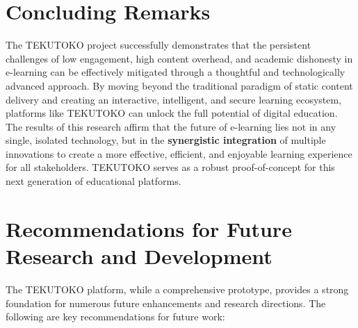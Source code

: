 \section{Concluding Remarks}
\label{sec:conclusion-remarks}
The TEKUTOKO project successfully demonstrates that the persistent challenges of low engagement, high content overhead, and academic dishonesty in e-learning can be effectively mitigated through a thoughtful and technologically advanced approach. By moving beyond the traditional paradigm of static content delivery and creating an interactive, intelligent, and secure learning ecosystem, platforms like TEKUTOKO can unlock the full potential of digital education. The results of this research affirm that the future of e-learning lies not in any single, isolated technology, but in the \textbf{synergistic integration} of multiple innovations to create a more effective, efficient, and enjoyable learning experience for all stakeholders. TEKUTOKO serves as a robust proof-of-concept for this next generation of educational platforms.

\section{Recommendations for Future Research and Development}
\label{sec:conclusion-future-work}
The TEKUTOKO platform, while a comprehensive prototype, provides a strong foundation for numerous future enhancements and research directions. The following are key recommendations for future work:

